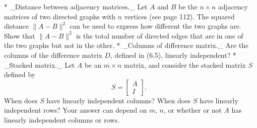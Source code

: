 * _Distance between adjacency matrices._ Let \(A\) and \(B\) be the \(n\times n\) adjacency matrices of two directed graphs with \(n\) vertices (see page 112). The squared distance \(\|A-B\|^{2}\) can be used to express how different the two graphs are. Show that \(\|A-B\|^{2}\) is the total number of directed edges that are in one of the two graphs but not in the other.
* _Columns of difference matrix._ Are the columns of the difference matrix \(D\), defined in (6.5), linearly independent?
* _Stacked matrix._ Let \(A\) be an \(m\times n\) matrix, and consider the stacked matrix \(S\) defined by \[S=\left[\begin{array}{c}A\\ I\end{array}\right].\] When does \(S\) have linearly independent columns? When does \(S\) have linearly independent rows? Your answer can depend on \(m\), \(n\), or whether or not \(A\) has linearly independent columns or rows.
 